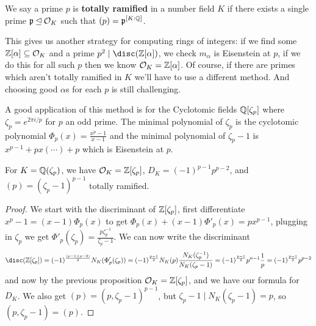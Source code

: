\documentclass{article}
\begin{document}
\begin{definition}
    We say a prime $p$ is \textbf{totally ramified} in a number field $K$ if there exists a single prime $\mathfrak{p}\unlhd \mathcal{O}_K$ such that $(p)=\mathfrak{p}^{[K:\mathbb{Q}]}$.
\end{definition}

This gives us another strategy for computing rings of integers: if we find some $\mathbb{Z}[\alpha]\subseteq \mathcal{O}_K$ and a prime $p^2\mid\disc(\bZ[\alpha])$, we check $m_\alpha$ is Eisenstein at $p$, if we do this for all such $p$ then we know $\mathcal{O}_K=\mathbb{Z}[\alpha]$. Of course, if there are primes which aren't totally ramified in $K$ we'll have to use a different method. And choosing good $\alpha$s for each $p$ is still challenging.

A good application of this method is for the Cyclotomic fields $\mathbb{Q}[\zeta_p]$ where $\zeta_p=e^{2\pi i/p}$ for $p$ an odd prime. The minimal polynomial of $\zeta_p$ is the cyclotomic polynomial $\Phi_p(x) = \frac{x^p-1}{x-1}$ and the minimal polynomial of $\zeta_p-1$ is $x^{p-1}+px(\cdots) + p$ which is Eisenstein at $p$.

\begin{proposition}
    For $K=\mathbb{Q}(\zeta_p)$, we have $\mathcal{O}_K=\mathbb{Z}[\zeta_p]$, $D_K=(-1)^{p-1}p^{p-2}$, and $(p)=(\zeta_p-1)^{p-1}$ totally ramified.
    \begin{proof}
        We start with the discriminant of $\mathbb{Z}[\zeta_p]$, first differentiate $x^p-1=(x-1)\Phi_p(x)$ to get $\Phi_p(x)+(x-1)\Phi'_p(x)=px^{p-1}$, plugging in $\zeta_p$ we get $\Phi'_p(\zeta_p) = \frac{p\zeta_p^{-1}}{\zeta_p-1}$. We can now write the discriminant \[
            \disc(\bZ[\zeta_p]) = (-1)^{\frac{(p-1)(p-2)}{2}}N_K(\Phi_p'(\zeta_p)) = (-1)^\frac{p-1}{2}N_K(p)\frac{N_K(\zeta_p^{-1})}{N_K(\zeta_p-1)} = (-1)^\frac{p-1}{2}p^{n-1}\frac{1}{p} = (-1)^\frac{p-1}{2}p^{p-2}
        \] and now by the previous proposition $\mathcal{O}_K=\mathbb{Z}[\zeta_p]$, and we have our formula for $D_K$. We also get $(p)=(p,\zeta_p-1)^{p-1}$, but $\zeta_p-1\mid N_K(\zeta_p-1)=p$, so $(p,\zeta_p-1)=(p)$.
    \end{proof}
\end{proposition}
\end{document}
